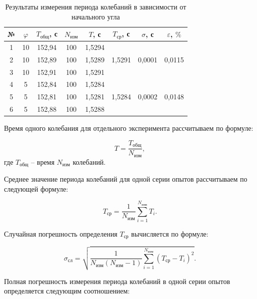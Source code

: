 \documentclass[a4paper,12pt]{article} %
\begin{document}
\begin{table}[h!]
	\begin{center}
		\begin{tabular}{|c|c|c|c|c|c|c|c|}
		\hline
		№ & $ \varphi $ & $ T_\text{общ} $, с & $ N_\text{изм} $ & $ T $, с   & $ T_\text{ср} $, с     & $ \sigma $, с     & $\varepsilon$, $ \% $       \\ \hline
		1 & 10 & 152,94    & 100        & 1,5294 &          &          &             \\ \cline{1-5}
		2 & 10 & 152,89    & 100        & 1,5289 & 1,5291 & 0,0001 & 0,0115 \\ \cline{1-5}
		3 & 10 & 152,91    & 100        & 1,5291 &          &          &             \\ \hline
		4 & 5  & 152,84    & 100        & 1,5284 &          &          &             \\ \cline{1-5}
		5 & 5  & 152,81    & 100        & 1,5281 & 1,5284 & 0,0002 & 0,0148 \\ \cline{1-5}
		6 & 5  & 152,88    & 100        & 1,5288 &          &          &             \\ \hline
	\end{tabular}
	\end{center}
	\caption{Результаты измерения периода колебаний в зависимости от начального угла}
\label{tab1}
\end{table}

Время одного колебания для отдельного эксперимента рассчитываем по формуле:

\begin{equation}
T=\frac{T_\text{общ}}{N_\text{изм}},
\end{equation}
где $ T_\text{общ} $ -- время $ N_\text{изм} $ колебаний.

Среднее значение периода колебаний для одной серии опытов рассчитываем по следующей формуле:

\begin{equation}
T_\text{ср}=\frac{1}{N_\text{изм}}\sum_{i=1}^{N_\text{изм}}T_i.
\end{equation}

Случайная погрешность определения $ T_\text{ср} $ вычисляется по формуле:

\begin{equation}
\sigma_\text{сл}=\sqrt{\frac{1}{N_\text{изм}\left( N_\text{изм} - 1 \right)}\sum_{i=1}^{N_\text{изм}}\left( T_\text{ср} - T_i \right)^2 }.
\end{equation}

Полная погрешность измерения периода колебаний в одной серии опытов определяется следующим соотношением:
\end{document}
